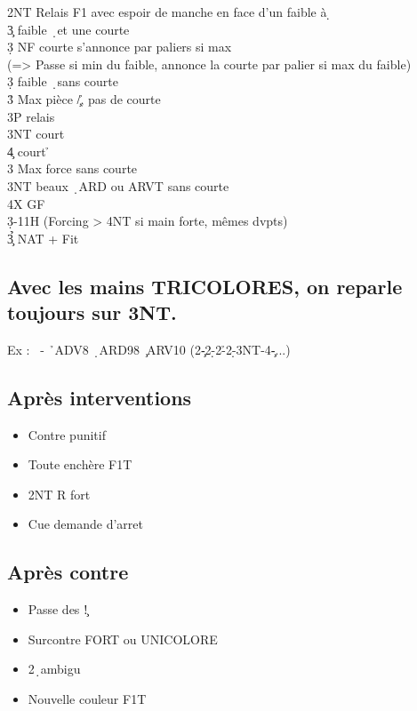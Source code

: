 \documentclass[a4paper]{article}
\begin{document}
\begin{bidtable}
2NT \> Relais F1 avec espoir de manche en face d’un faible à \d \+\\
3\c \> faible \d\ et une courte\+\\
3\d \> NF courte s’annonce par paliers si max\\
\>(=> Passe si min du faible, annonce la courte par palier si max du faible)\-\\
3\d \> faible \d\ sans courte\\
3\h \> Max pièce \c /\h , pas de courte\+\\
3P \> relais\+\\
3NT \> court \c \\
4\c \> court \h \-\-\\
3\s \> Max force sans courte\\
3NT \> beaux \d\ ARD ou ARVT sans courte\\
4X \> GF\-\\
3\d {}-11H (Forcing > 4NT si main forte, mêmes dvpts)\\
3\h{}\c \> NAT + Fit\-
\end{bidtable}

\subsection{Avec les mains TRICOLORES, on reparle toujours sur 3NT.}

Ex : \s\ - \h\ ADV8 \d\ ARD98 \c\ ARV10
(2\c -2\d -2\h -2\d -3NT-4\c -...)

\subsection{Après interventions}

\begin{itemize}
\item Contre punitif

\item Toute enchère F1T

\item 2NT R fort

\item Cue demande d'arret

\end{itemize}

\subsection{Après contre}

\begin{itemize}
\item Passe des \c !

\item Surcontre FORT ou UNICOLORE

\item 2\d\ ambigu

\item Nouvelle couleur F1T

\end{itemize}
\end{document}
